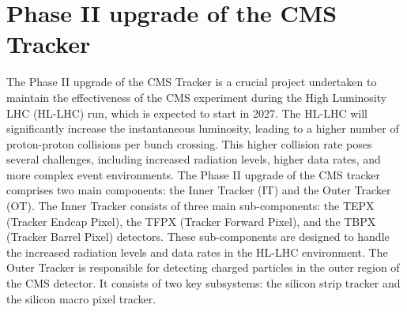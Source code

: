 \chapter{Phase II upgrade of the CMS Tracker}  %

\ifpdf
    \graphicspath{{Chapter7/Figs/Raster/}{Chapter7/Figs/PDF/}{Chapter7/Figs/}}
\else
    \graphicspath{{Chapter7/Figs/Vector/}{Chapter7/Figs/}}
\fi


The Phase II upgrade of the CMS Tracker is a crucial project undertaken to maintain the effectiveness of the CMS experiment during the High Luminosity LHC (HL-LHC) run, which is expected to start in 2027. The HL-LHC will significantly increase the instantaneous luminosity, leading to a higher number of proton-proton collisions per bunch crossing. This higher collision rate poses several challenges, including increased radiation levels, higher data rates, and more complex event environments. The Phase II upgrade of the CMS tracker comprises two main components: the Inner Tracker (IT) and the Outer Tracker (OT). The Inner Tracker consists of three main sub-components: the TEPX (Tracker Endcap Pixel), the TFPX (Tracker Forward Pixel), and the TBPX (Tracker Barrel Pixel) detectors. These sub-components are designed to handle the increased radiation levels and data rates in the HL-LHC environment. The Outer Tracker is responsible for detecting charged particles in the outer region of the CMS detector. It consists of two key subsystems: the silicon strip tracker and the silicon macro pixel tracker.


